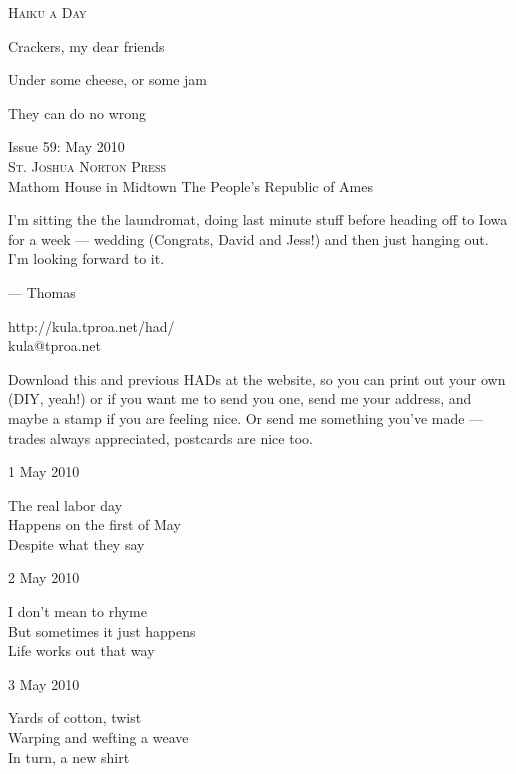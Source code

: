 \documentclass[12pt]{article}
\begin{document}
\begin{center}
{\fontsize{36}{48}\selectfont \textsc{Haiku a Day }}
\end{center}

\vspace*{3.5cm}

{\fontsize{20}{40}\selectfont 

Crackers, my dear friends

Under some cheese, or some jam

They can do no wrong


}

\vspace*{5.0cm}
\begin{center}
{\large{Issue 59: May 2010}} \\[5mm]
{\fontsize{8}{8}\selectfont  \textsc{ St. Joshua Norton Press }} \\[1mm]
{\fontsize{6}{6}\selectfont Mathom House in Midtown \textbar The People's Republic of Ames }
\end{center}


\newpage

I'm sitting the the laundromat, doing last minute stuff before
heading off to Iowa for a week --- wedding (Congrats, David and
Jess!) and then just hanging out. I'm looking forward to it.

--- Thomas

http://kula.tproa.net/had/ \\
kula@tproa.net

Download this and previous HADs at the website, so you can
print out your own (DIY, yeah!) or if you want me to send
you one, send me your address, and maybe a stamp if you
are feeling nice. Or send me something you've made ---
trades always appreciated, postcards are nice too.

\vspace*{2.5cm}

1 May 2010

The real labor day \\
Happens on the first of May \\
Despite what they say

2 May 2010

I don't mean to rhyme \\
But sometimes it just happens \\
Life works out that way

3 May 2010

Yards of cotton, twist \\
Warping and wefting a weave \\
In turn, a new shirt
\end{document}
